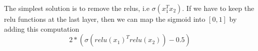 The simplest solution is to remove the relus, i.e $\sigma(x_1^T x_2)$.
If we have to keep the relu functions at the last layer, then we can map the sigmoid into $[0,1]$ by adding this computation
$$2*(\sigma (relu(x_1)^T relu(x_2)) - 0.5)$$